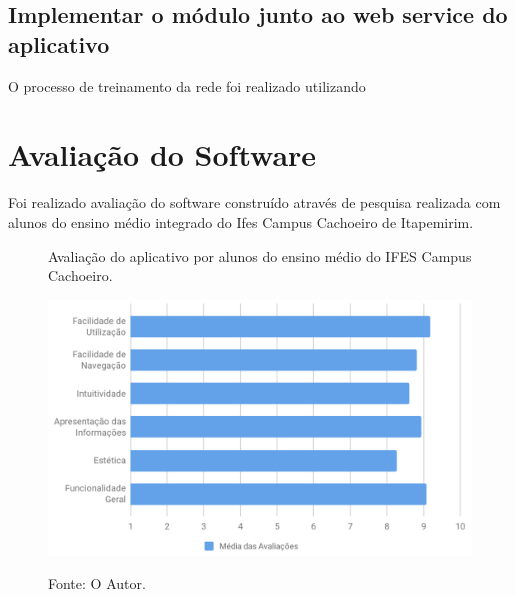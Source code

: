 \subsection{Implementar o módulo junto ao web service do aplicativo}

O processo de treinamento da rede foi realizado utilizando 

\section{Avaliação do Software}

Foi realizado avaliação do software construído através de pesquisa realizada com alunos do ensino médio integrado do Ifes Campus Cachoeiro de Itapemirim. 

\begin{figure}[H]
	\caption{Avaliação do aplicativo por alunos do ensino médio do IFES Campus Cachoeiro.}
	\centering %
	\includegraphics[width=15cm]{resources/pesquisa_avaliacao.png} %
	\label{figura:avaliacao}
	\captionsetup{singlelinecheck = false, format= hang, justification=raggedright, labelsep=space, width=15cm}
	\caption*{\footnotesize Fonte: O Autor.}
\end{figure}